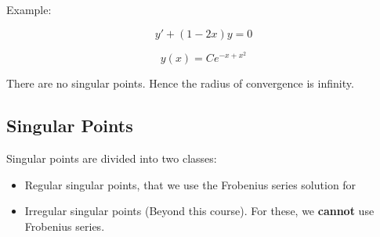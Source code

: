 \documentclass{article}
\begin{document}
Example:

$$y' + (1 - 2x)y =0$$

$$y(x) = C e^{-x + x^2}$$

There are no singular points. Hence the radius of convergence is infinity. 

\subsection{Singular Points}

Singular points are divided into two classes:

\begin{itemize}
    \item Regular singular points, that we use the Frobenius series solution for
    \item Irregular singular points (Beyond this course). For these, we \textbf{cannot} use Frobenius series. 
\end{itemize}
\end{document}
